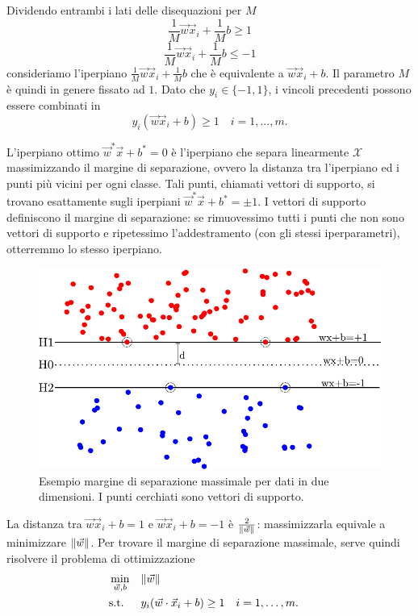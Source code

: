 Dividendo entrambi i lati delle disequazioni per $M$
\begin{equation*}
\frac{1}{M}\Vec{w}\Vec{x}_i + \frac{1}{M}b \geq 1
\end{equation*}
\begin{equation*}
\frac{1}{M}\Vec{w}\Vec{x}_i + \frac{1}{M}b \leq -1
\end{equation*}
consideriamo l'iperpiano $\frac{1}{M}\Vec{w}\Vec{x}_i + \frac{1}{M}b$ che è equivalente a $\Vec{w}\Vec{x}_i + b$. Il parametro $M$ è quindi in genere fissato ad $1$.
Dato che $y_i\in\{-1,1\}$, i vincoli precedenti possono essere combinati in
\begin{equation*}
    y_i(\Vec{w}\Vec{x}_i + b) \geq 1 \quad i=1, ..., m.
\end{equation*}

L'iperpiano ottimo $\Vec{w}^*\Vec{x} + b^* = 0$ è l'iperpiano che separa linearmente $\mathcal{X}$ massimizzando il margine di separazione, ovvero la distanza tra l'iperpiano ed i punti più vicini per ogni classe. Tali punti, chiamati vettori di supporto, si trovano esattamente sugli iperpiani $\Vec{w}^*\Vec{x} + b^* = \pm 1$. I vettori di supporto definiscono il margine di separazione: se rimuovessimo tutti i punti che non sono vettori di supporto e ripetessimo l'addestramento (con gli stessi iperparametri), otterremmo lo stesso iperpiano.
\begin{figure}
    \centering
    \includegraphics[width=0.7\linewidth]{img/margine_separazione.pdf}
    \caption{Esempio margine di separazione massimale per dati in due dimensioni. I punti cerchiati sono vettori di supporto.}
    \label{fig:optimal_separation_margin}
\end{figure}
%
La distanza tra $\Vec{w}\Vec{x}_i + b = 1$ e $\Vec{w}\Vec{x}_i + b = -1$ è $\frac{2}{\|\Vec{w}\|}$: massimizzarla equivale a minimizzare $\|\Vec{w}\|$. Per trovare il margine di separazione massimale, serve quindi risolvere il problema di ottimizzazione
%
\begin{equation}
\label{eq:svc:hardmargin:primal}
\begin{aligned}
& \min_{\Vec{w},b} && \|\Vec{w}\| \\
& \textrm{s.t.} && y_i(\Vec{w}\cdot \Vec{x}_i + b) \geq 1 && i=1,\dots,m. \\
\end{aligned}
\end{equation}
